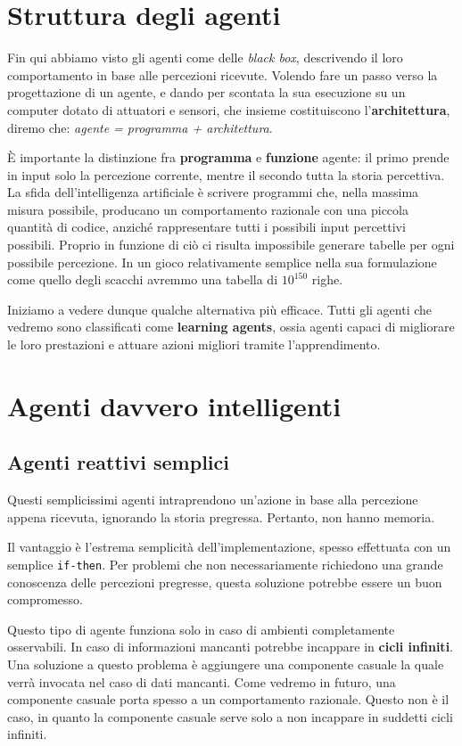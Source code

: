 \section{Struttura degli agenti}
    Fin qui abbiamo visto gli agenti come delle \textit{black box}, descrivendo il loro comportamento in base alle percezioni ricevute. Volendo fare un passo verso la progettazione di un agente, e dando per scontata la sua esecuzione su un computer dotato di attuatori e sensori, che insieme costituiscono l'\textbf{architettura}, diremo che: \textit{agente = programma + architettura}.
    
    È importante la distinzione fra \textbf{programma} e \textbf{funzione} agente: il primo prende in input solo la percezione corrente, mentre il secondo tutta la storia percettiva. La sfida dell'intelligenza artificiale è scrivere programmi che, nella massima misura possibile, producano un comportamento razionale con una piccola quantità di codice, anziché rappresentare tutti i possibili input percettivi possibili. Proprio in funzione di ciò ci risulta impossibile generare tabelle per ogni possibile percezione. In un gioco relativamente semplice nella sua formulazione come quello degli scacchi avremmo una tabella di $10^{150}$ righe.
    
    Iniziamo a vedere dunque qualche alternativa più efficace. Tutti gli agenti che vedremo sono classificati come \textbf{learning agents}, ossia agenti capaci di migliorare le loro prestazioni e attuare azioni migliori tramite l'apprendimento.
    
\section{Agenti davvero intelligenti}
    \subsection{Agenti reattivi semplici}
        Questi semplicissimi agenti intraprendono un'azione in base alla percezione appena ricevuta, ignorando la storia pregressa. Pertanto, non hanno memoria.
        
        Il vantaggio è l'estrema semplicità dell'implementazione, spesso effettuata con un semplice \texttt{if-then}. Per problemi che non necessariamente richiedono una grande conoscenza delle percezioni pregresse, questa soluzione potrebbe essere un buon compromesso.
        
        Questo tipo di agente funziona solo in caso di ambienti completamente osservabili. In caso di informazioni mancanti potrebbe incappare in \textbf{cicli infiniti}. Una soluzione a questo problema è aggiungere una componente casuale la quale verrà invocata nel caso di dati mancanti. Come vedremo in futuro, una componente casuale porta spesso a un comportamento razionale. Questo non è il caso, in quanto la componente casuale serve solo a non incappare in suddetti cicli infiniti.
        
